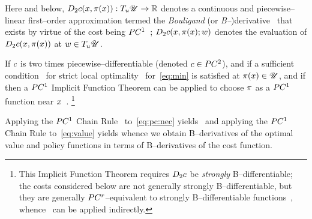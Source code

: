 \documentclass{article}
\begin{document}
Here and below, 
$D_2 c(x,\pi(x)):T_u\mathscr{U}\rightarrow\mathbb{R}$ 
denotes a continuous and piecewise--linear first--order approximation termed the \emph{Bouligand} (or \emph{B--})derivative~\citep[Ch.~3]{Scholtes2012-la} that exists by virtue of the cost being $PC^1$~\citep[Lem.~4.1.3]{Scholtes2012-la}; 
$D_2 c(x,\pi(x);w)$ 
denotes the evaluation of
$D_2 c(x,\pi(x))$
at $w\in T_u\mathscr{U}$.

If 
$c$ is two times piecewise--differentiable (denoted $c\in PC^2$), 
and if a sufficient condition~\cite[Thm.~1]{Chaney1988-zq} for strict local optimality%
%
~for~\eqref{eq:min} is satisfied at $\pi(x)\in\mathscr{U}$,
and if%
then a $PC^1$ Implicit Function Theorem can be applied to choose $\pi$ as a $PC^1$ function near $x$~\citep[Cor.~3.4]{Robinson1991-xg}.%
\footnote{This Implicit Function Theorem requires $D_2c$ be \emph{strongly} B--differentiable; the costs considered below are not generally strongly B--differentiable, but they are generally $PC^r$--equivalent to strongly B--differentiable functions~\cite[Thm.~3.1]{Kuntz1994-qf}, whence~\cite[Cor.~3.4]{Robinson1991-xg} can be applied indirectly.}

Applying the $PC^1$ Chain Rule~\citep[Thm.~3.1.1]{Scholtes2012-la} to~\eqref{eq:pc:nec} yields~
and applying the $PC^1$ Chain Rule to~\eqref{eq:value} yields
whence we obtain B--derivatives of the optimal value and policy functions in terms of B--derivatives of the cost function.
\end{document}
